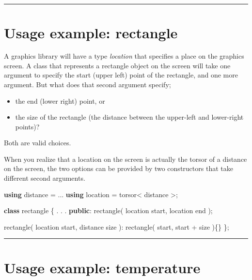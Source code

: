 \documentclass[]{article}
\newenvironment{Shaded}{}{}
\newcommand{\KeywordTok}[1]{\textcolor[rgb]{0.00,0.44,0.13}{\textbf{#1}}}
\newcommand{\NormalTok}[1]{#1}
\begin{document}
\begin{center}\rule{0.5\linewidth}{\linethickness}\end{center}

\hypertarget{usage-example-rectangle}{%
\section{Usage example: rectangle}\label{usage-example-rectangle}}

A graphics library will have a type \emph{location} that specifies a
place on the graphics screen. A class that represents a rectangle object
on the screen will take one argument to specify the start (upper left)
point of the rectangle, and one more argument. But what does that second
argument specify;

\begin{itemize}
\item
  the end (lower right) point, or
\item
  the size of the rectangle (the distance between the upper-left and
  lower-right points)?
\end{itemize}

Both are valid choices.

When you realize that a location on the screen is actually the torsor of
a distance on the screen, the two options can be provided by two
constructors that take different second arguments.

\begin{Shaded}
\begin{Highlighting}[]
\KeywordTok{using}\NormalTok{ distance = ...}
\KeywordTok{using}\NormalTok{ location = torsor< distance >;}

\KeywordTok{class}\NormalTok{ rectangle \{}
\NormalTok{   . . .}
\KeywordTok{public}\NormalTok{:}
\NormalTok{   rectangle( location start, location end );}
   
\NormalTok{   rectangle( location start, distance size ): }
\NormalTok{      rectangle( start, start + size )\{\}}
\NormalTok{\}; }
\end{Highlighting}
\end{Shaded}

\begin{center}\rule{0.5\linewidth}{\linethickness}\end{center}

\hypertarget{usage-example-temperature}{%
\section{Usage example: temperature}\label{usage-example-temperature}}
\end{document}
